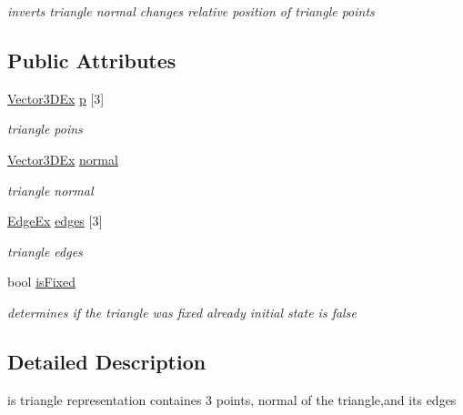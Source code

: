 \begin{DoxyCompactItemize}
\begin{DoxyCompactList}\small\item\em inverts triangle normal changes relative position of triangle points \end{DoxyCompactList}\end{DoxyCompactItemize}
\subsection*{\-Public \-Attributes}
\begin{DoxyCompactItemize}
\item 
\hyperlink{class_vector3_d_ex}{\-Vector3\-D\-Ex} \hyperlink{class_triangle_a9e466f5709e47ed3b7874c09587aab01}{p} \mbox{[}3\mbox{]}
\begin{DoxyCompactList}\small\item\em triangle poins \end{DoxyCompactList}\item 
\hyperlink{class_vector3_d_ex}{\-Vector3\-D\-Ex} \hyperlink{class_triangle_a938abc73dc5a807c0a9611cd2800b2cf}{normal}
\begin{DoxyCompactList}\small\item\em triangle normal \end{DoxyCompactList}\item 
\hyperlink{class_edge_ex}{\-Edge\-Ex} \hyperlink{class_triangle_a8fb38b24b4cbaf6c74ab589ee503fbb1}{edges} \mbox{[}3\mbox{]}
\begin{DoxyCompactList}\small\item\em triangle edges \end{DoxyCompactList}\item 
\hypertarget{class_triangle_a4fe94831d15a2c454d661a2937747dc6}{
bool \hyperlink{class_triangle_a4fe94831d15a2c454d661a2937747dc6}{is\-Fixed}}
\label{class_triangle_a4fe94831d15a2c454d661a2937747dc6}

\begin{DoxyCompactList}\small\item\em determines if the triangle was fixed already initial state is false \end{DoxyCompactList}\end{DoxyCompactItemize}


\subsection{\-Detailed \-Description}
is triangle representation containes 3 points, normal of the triangle,and its edges 

